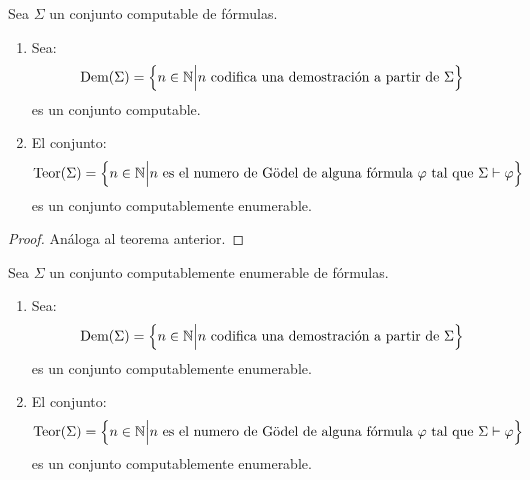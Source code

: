 \documentclass[12pt]{report}
\newcounter{it}
\theoremstyle{largebreak}
\begin{document}
    \begin{theor}
        Sea $\Sigma$ un conjunto {\selectfont
        computable} de fórmulas.
        \begin{enumerate}[label = \textit{(\arabic*)}]
            \item  Sea:
            \begin{equation*}
                \textup{Dem}(\Sigma)=\left\{n\in\mathbb{N}\Big|n\textup{ codifica una demostración a partir de }\Sigma \right\}
            \end{equation*}
            es un conjunto computable.
            \item El conjunto:
            \begin{equation*}
                \textup{Teor}(\Sigma)=\left\{n\in\mathbb{N}\Big|n\textup{ es el numero de Gödel de alguna fórmula $\varphi$ tal que }\Sigma\vdash\varphi \right\}
            \end{equation*}
            es un conjunto computablemente enumerable.
        \end{enumerate}
    \end{theor}

    \begin{proof}
        Análoga al teorema anterior.
    \end{proof}

    \begin{theor}
        Sea $\Sigma$ un conjunto {\selectfont
        computablemente enumerable} de fórmulas.
        \begin{enumerate}[label = \textit{(\arabic*)}]
            \item  Sea:
            \begin{equation*}
                \textup{Dem}(\Sigma)=\left\{n\in\mathbb{N}\Big|n\textup{ codifica una demostración a partir de }\Sigma \right\}
            \end{equation*}
            es un conjunto computablemente enumerable.
            \item El conjunto:
            \begin{equation*}
                \textup{Teor}(\Sigma)=\left\{n\in\mathbb{N}\Big|n\textup{ es el numero de Gödel de alguna fórmula $\varphi$ tal que }\Sigma\vdash\varphi \right\}
            \end{equation*}
            es un conjunto computablemente enumerable.
        \end{enumerate}
    \end{theor}
\end{document}
